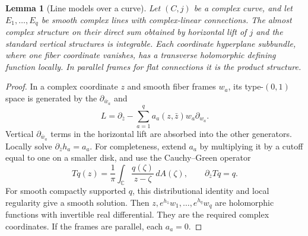 \documentclass[11pt]{article}
\newtheorem{lemma}[theorem]{Lemma}
\theoremstyle{definition}
\theoremstyle{remark}
\newcommand{\C}{\mathbb C}
\begin{document}

\begin{lemma}[Line models over a curve]\label{lem:curve}
Let $(C,j)$ be a complex curve, and let $E_1,\ldots,E_q$ be smooth complex lines with complex-linear connections. The almost complex structure on their direct sum obtained by horizontal lift of $j$ and the standard vertical structures is integrable. Each coordinate hyperplane subbundle, where one fiber coordinate vanishes, has a transverse holomorphic defining function locally. In parallel frames for flat connections it is the product structure.
\end{lemma}
\begin{proof}
In a complex coordinate $z$ and smooth fiber frames $w_a$, its type-$(0,1)$ space is generated by the $\partial_{\bar w_a}$ and
\[
 L=\partial_{\bar z}-\sum_{a=1}^q a_a(z,\bar z)w_a\partial_{w_a}.
\]
Vertical $\partial_{\bar w_a}$ terms in the horizontal lift are absorbed into the other generators. Locally solve $\partial_{\bar z}h_a=a_a$. For completeness, extend $a_a$ by multiplying it by a cutoff equal to one on a smaller disk, and use the Cauchy--Green operator
\[
 Tq(z)=\frac1\pi\int_\C\frac{q(\zeta)}{z-\zeta}\,dA(\zeta),
 \qquad \partial_{\bar z}Tq=q.
\]
For smooth compactly supported $q$, this distributional identity and local regularity give a smooth solution. Then $z,e^{h_1}w_1,\ldots,e^{h_q}w_q$ are holomorphic functions with invertible real differential. They are the required complex coordinates. If the frames are parallel, each $a_a=0$.
\end{proof}
\end{document}
